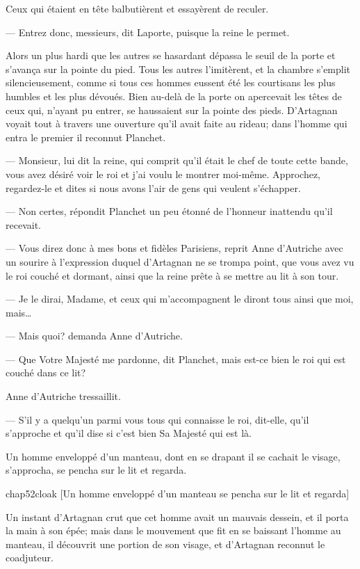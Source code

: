 Ceux qui étaient en tête balbutièrent et essayèrent de reculer.

— Entrez donc, messieurs, dit Laporte, puisque la reine le permet.

Alors un plus hardi que les autres se hasardant dépassa le seuil de la porte et s'avança sur la pointe du pied. Tous les autres l'imitèrent, et la chambre s'emplit silencieusement, comme si tous ces hommes eussent été les courtisans les plus humbles et les plus dévoués. Bien au-delà de la porte on apercevait les têtes de ceux qui, n'ayant pu entrer, se haussaient sur la pointe des pieds. D'Artagnan voyait tout à travers une ouverture qu'il avait faite au rideau; dans l'homme qui entra le premier il reconnut Planchet.

— Monsieur, lui dit la reine, qui comprit qu'il était le chef de toute cette bande, vous avez désiré voir le roi et j'ai voulu le montrer moi-même. Approchez, regardez-le et dites si nous avons l'air de gens qui veulent s'échapper.

— Non certes, répondit Planchet un peu étonné de l'honneur inattendu qu'il recevait.

— Vous direz donc à mes bons et fidèles Parisiens, reprit Anne d'Autriche avec un sourire à l'expression duquel d'Artagnan ne se trompa point, que vous avez vu le roi couché et dormant, ainsi que la reine prête à se mettre au lit à son tour.

— Je le dirai, Madame, et ceux qui m'accompagnent le diront tous ainsi que moi, mais\dots

— Mais quoi? demanda Anne d'Autriche.

— Que Votre Majesté me pardonne, dit Planchet, mais est-ce bien le roi qui est couché dans ce lit?

Anne d'Autriche tressaillit.

— S'il y a quelqu'un parmi vous tous qui connaisse le roi, dit-elle, qu'il s'approche et qu'il dise si c'est bien Sa Majesté qui est là.

Un homme enveloppé d'un manteau, dont en se drapant il se cachait le visage, s'approcha, se pencha sur le lit et regarda.

\begin{bwbigpic}
	[\basicscale] 
	{chap52cloak}
	[Un homme enveloppé d'un manteau se pencha sur le lit et regarda]
\end{bwbigpic}

Un instant d'Artagnan crut que cet homme avait un mauvais dessein, et il porta la main à son épée; mais dans le mouvement que fit en se baissant l'homme au manteau, il découvrit une portion de son visage, et d'Artagnan reconnut le coadjuteur.

